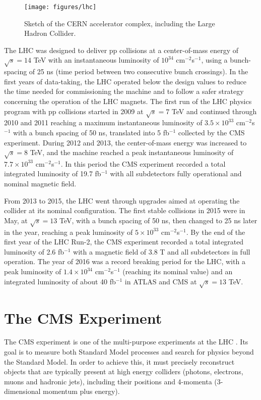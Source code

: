 \begin{figure}[h]
\centering 
\texttt{[image: figures/lhc]}\hfil
\caption{Sketch of the CERN accelerator complex, including the Large Hadron Collider. }
\label{fig:lhc}
\end{figure}

The LHC was designed to deliver pp collisions at a center-of-mass energy of $\sqrt{s} = 14$ TeV with an instantaneous luminosity of $10^{34}$ cm$^{-2}$s$^{-1}$, using a bunch-spacing of 25 ns (time period between two consecutive bunch crossings). 
In the first years of data-taking, the LHC operated below the design values to reduce the time needed for commissioning the machine and to follow a safer strategy concerning the operation of the LHC magnets.
The first run of the LHC physics program with pp collisions started in 2009 at $\sqrt{s} = 7$ TeV and continued through 2010 and 2011 reaching a maximum instantaneous luminosity of $3.5 \times 10^{33}$ cm$^{-2}$s$^{-1}$ with a bunch spacing of 50 ns, translated into 5 fb$^{-1}$ collected by the CMS experiment. 
During 2012 and 2013, the center-of-mass energy was increased to $\sqrt{s} = 8$ TeV, and the machine reached a peak instantaneous luminosity of $7.7 \times 10^{33}$ cm$^{-2}$s$^{-1}$. 
In this period the CMS experiment recorded a total integrated luminosity of 19.7 fb$^{-1}$ with all subdetectors fully operational and nominal magnetic field.

From 2013 to 2015, the LHC went through upgrades aimed at operating the collider at its nominal configuration. 
The first stable collisions in 2015 were in May, at $\sqrt{s} = 13$ TeV, with a bunch spacing of 50 ns, then changed to 25 ns later in the year, reaching a peak luminosity of $5 \times 10^{33}$ cm$^{-2}$s$^{-1}$. 
By the end of the first year of the LHC Run-2, the CMS experiment recorded a total integrated
luminosity of 2.6 fb$^{-1}$ with a magnetic field of 3.8 T and all subdetectors in full operation. 
The year of 2016 was a record breaking period for the LHC, with a peak luminosity of $1.4\times10^{34}$ cm$^{-2}$s$^{-1}$ (reaching its nominal value) and an integrated luminosity of about 40 fb$^{-1}$ in ATLAS and CMS at $\sqrt{s} = 13$ TeV. 

\section{The CMS Experiment}

The CMS experiment is one of the multi-purpose experiments at the LHC \cite{cms_tdr}. 
Its goal is to measure both Standard Model processes and search for physics beyond the Standard Model. 
In order to achieve this, it must precisely reconstruct objects that are typically present at high energy colliders (photons, electrons, muons and hadronic jets), including their positions and 4-momenta (3-dimensional momentum plus energy).  

